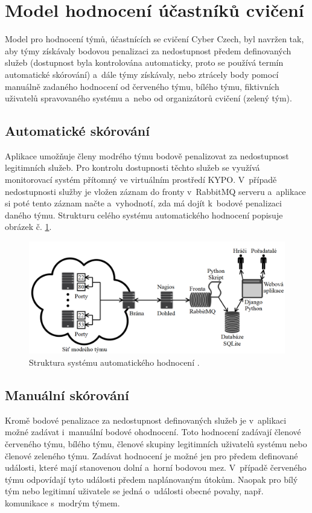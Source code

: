 \documentclass[
  digital,
  twoside,
  table, 
  nolof, 
  nolot
]{fithesis3}
\begin{document}
\section{Model hodnocení účastníků cvičení}
Model pro hodnocení týmů, účastnících se cvičení Cyber Czech, byl navržen tak, aby týmy získávaly bodovou penalizaci za nedostupnost předem definovaných služeb (dostupnost byla kontrolována automaticky, proto se používá termín automatické skórování) a~dále týmy získávaly, nebo ztrácely body pomocí manuálně zadaného hodnocení od červeného týmu, bílého týmu, fiktivních uživatelů spravovaného systému a~nebo od organizátorů cvičení (zelený tým).

\subsection{Automatické skórování}
Aplikace umožňuje členy modrého týmu bodově penalizovat za nedostupnost legitimních služeb. Pro kontrolu dostupnosti těchto služeb se využívá monitorovací systém přítomný ve virtuálním prostředí KYPO. V~případě nedostupnosti služby je vložen záznam do fronty v~RabbitMQ \cite{rabitmq} serveru a~aplikace si poté tento záznam načte a~vyhodnotí, zda má dojít k~bodové penalizaci daného týmu. Strukturu celého systému automatického hodnocení popisuje obrázek č. \ref{fig:autoScoring}.

\begin{figure}[h!]
    \centering
    \includegraphics[width=13cm]{images/Page-47-Image-27.png}
    \caption{Struktura systému automatického hodnocení \cite{Kostelnik2016thesis}.}
    \label{fig:autoScoring}
\end{figure}

\subsection{Manuální skórování}
Kromě bodové penalizace za nedostupnost definovaných služeb je v~aplikaci možné zadávat i~manuální bodové ohodnocení. Toto hodnocení zadávají členové červeného týmu, bílého týmu, členové skupiny legitimních uživatelů systému nebo členové zeleného týmu. Zadávat hodnocení je možné jen pro předem definované události, které mají stanovenou dolní a~horní bodovou mez. V~případě červeného týmu odpovídají tyto události předem naplánovaným útokům. Naopak pro bílý tým nebo legitimní uživatele se jedná o~události obecné povahy, např. komunikace s~modrým týmem.
\end{document}
